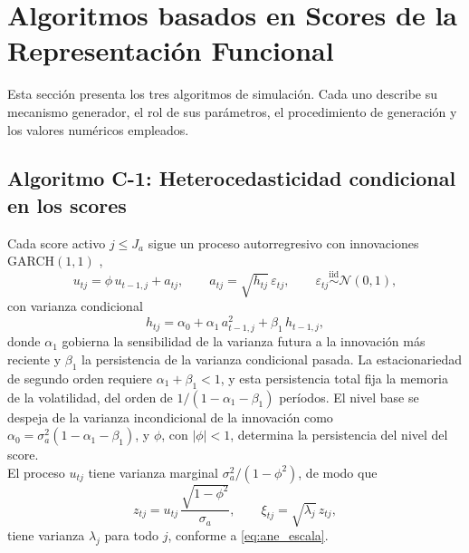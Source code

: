 \section{Algoritmos basados en Scores de la Representación Funcional}
\label{ane_00_02_algoritmos_scores}
Esta sección presenta los tres algoritmos de simulación. Cada uno describe su mecanismo generador, el rol de sus parámetros, el procedimiento de generación y los valores numéricos empleados.

\subsection{Algoritmo C-1: Heterocedasticidad condicional en los scores}
\label{ane_00_02_01_alg_c1}
Cada score activo $j\le J_a$ sigue un proceso autorregresivo con innovaciones GARCH$(1,1)$ \cite{ane_00_01_bollerslev1986generalized},
\begin{equation}\label{eq:ane_algC1_argarch}
    u_{tj} = \phi\, u_{t-1,j} + a_{tj},
    \qquad
    a_{tj} = \sqrt{h_{tj}}\, \varepsilon_{tj},
    \qquad
    \varepsilon_{tj} \overset{\mathrm{iid}}{\sim} \mathcal{N}(0,1),
\end{equation}
con varianza condicional
\begin{equation}\label{eq:ane_algC1_recursion}
    h_{tj} = \alpha_0 + \alpha_1\, a_{t-1,j}^2 + \beta_1\, h_{t-1,j},
\end{equation}
donde $\alpha_1$ gobierna la sensibilidad de la varianza futura a la innovación más reciente y $\beta_1$ la persistencia de la varianza condicional pasada. La estacionariedad de segundo orden requiere $\alpha_1+\beta_1<1$, y esta persistencia total fija la memoria de la volatilidad, del orden de $1/(1-\alpha_1-\beta_1)$ períodos. El nivel base se despeja de la varianza incondicional de la innovación como $\alpha_0=\sigma_a^{2}(1-\alpha_1-\beta_1)$, y $\phi$, con $|\phi|<1$, determina la persistencia del nivel del score.\\

El proceso $u_{tj}$ tiene varianza marginal $\sigma_a^{2}/(1-\phi^{2})$, de modo que
\begin{equation}
\label{eq:ane_algC1_score}
z_{tj}=u_{tj}\,\frac{\sqrt{1-\phi^{2}}}{\sigma_a},
\qquad
\xi_{tj}=\sqrt{\lambda_j}\,z_{tj},
\end{equation}
tiene varianza $\lambda_j$ para todo $j$, conforme a \eqref{eq:ane_escala}.\\

